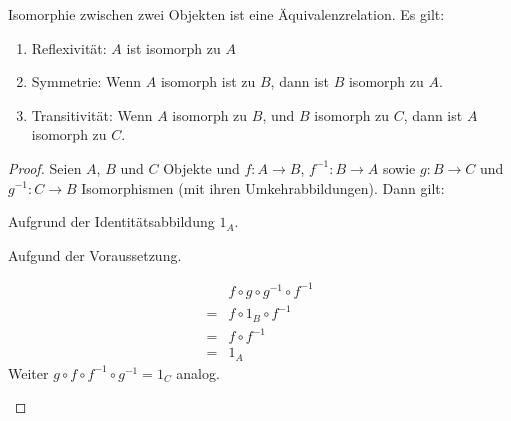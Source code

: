 \documentclass[parskip=half]{scrreprt}
\begin{document}
\begin{theorem}
Isomorphie zwischen zwei Objekten ist eine Äquivalenzrelation. Es gilt:
\begin{enumerate}
\item \label{def:IsoRef} Reflexivität: $A$ ist isomorph zu $A$
\item \label{def:IsoSym} Symmetrie: Wenn $A$ isomorph ist zu $B$, 
							dann ist $B$ isomorph zu $A$.
\item \label{def:IsoTra} Transitivität: Wenn $A$ isomorph zu $B$, 
							und $B$ isomorph zu $C$,
							dann ist $A$ isomorph zu $C$.
\end{enumerate}
\end{theorem}

\begin{proof}
Seien $A$, $B$ und $C$ Objekte und $f: A → B$, $f^{-1}: B → A$ sowie $g: B → C$ 
und $g^{-1}: C → B$ Isomorphismen (mit ihren Umkehrabbildungen).
Dann gilt:

\begin{subproof}[Reflexivität]
Aufgrund der Identitätsabbildung $1_A$.
\end{subproof}
\begin{subproof}[Symmetrie] 
Aufgund der Voraussetzung.
\end{subproof}
\begin{subproof}[Transitivität]
\begin{align*}\label{sp:IsoTrans}
	  &f ∘ g ∘ g^{-1} ∘ f^{-1}  \\	%
	= &f ∘ 1_B ∘ f^{-1}			\\%
	= &f ∘ f^{-1}				\\%
	= &1_A						%
\end{align*}
Weiter $ g ∘ f ∘ f^{-1}∘ g^{-1} = 1_C$ analog.
\end{subproof}
\end{proof}
\end{document}
